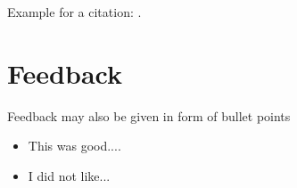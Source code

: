 \documentclass[a4paper, 9pt, twocolumn]{extarticle}
\begin{document}

Example for a citation: \cite{Mueller07_InformationRetrieval_SPRINGER, fundamentals}.


\newpage

\section{Feedback}
\label{section:feedback}




Feedback may also be given in form of bullet points
\begin{itemize}
    \item This was good....
    \item I did not like...
\end{itemize}




\small

\end{document}
